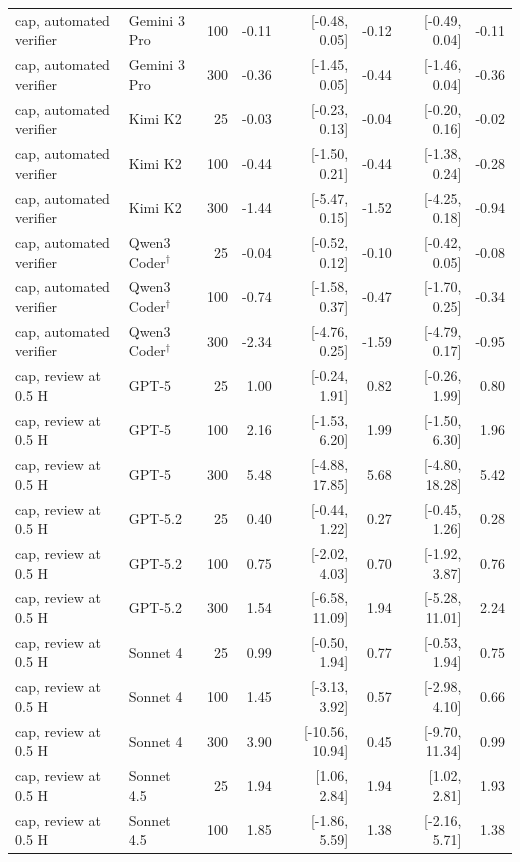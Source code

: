 \begin{table}[t]
\begin{tabular}{llrrrrrr}
cap, automated verifier & Gemini 3 Pro & 100 & -0.11 & [-0.48, 0.05] & -0.12 & [-0.49, 0.04] & -0.11 \\
cap, automated verifier & Gemini 3 Pro & 300 & -0.36 & [-1.45, 0.05] & -0.44 & [-1.46, 0.04] & -0.36 \\
cap, automated verifier & Kimi K2 & 25 & -0.03 & [-0.23, 0.13] & -0.04 & [-0.20, 0.16] & -0.02 \\
cap, automated verifier & Kimi K2 & 100 & -0.44 & [-1.50, 0.21] & -0.44 & [-1.38, 0.24] & -0.28 \\
cap, automated verifier & Kimi K2 & 300 & -1.44 & [-5.47, 0.15] & -1.52 & [-4.25, 0.18] & -0.94 \\
cap, automated verifier & Qwen3 Coder$^\dagger$ & 25 & -0.04 & [-0.52, 0.12] & -0.10 & [-0.42, 0.05] & -0.08 \\
cap, automated verifier & Qwen3 Coder$^\dagger$ & 100 & -0.74 & [-1.58, 0.37] & -0.47 & [-1.70, 0.25] & -0.34 \\
cap, automated verifier & Qwen3 Coder$^\dagger$ & 300 & -2.34 & [-4.76, 0.25] & -1.59 & [-4.79, 0.17] & -0.95 \\
\midrule
cap, review at 0.5 H & GPT-5 & 25 & 1.00 & [-0.24, 1.91] & 0.82 & [-0.26, 1.99] & 0.80 \\
cap, review at 0.5 H & GPT-5 & 100 & 2.16 & [-1.53, 6.20] & 1.99 & [-1.50, 6.30] & 1.96 \\
cap, review at 0.5 H & GPT-5 & 300 & 5.48 & [-4.88, 17.85] & 5.68 & [-4.80, 18.28] & 5.42 \\
cap, review at 0.5 H & GPT-5.2 & 25 & 0.40 & [-0.44, 1.22] & 0.27 & [-0.45, 1.26] & 0.28 \\
cap, review at 0.5 H & GPT-5.2 & 100 & 0.75 & [-2.02, 4.03] & 0.70 & [-1.92, 3.87] & 0.76 \\
cap, review at 0.5 H & GPT-5.2 & 300 & 1.54 & [-6.58, 11.09] & 1.94 & [-5.28, 11.01] & 2.24 \\
cap, review at 0.5 H & Sonnet 4 & 25 & 0.99 & [-0.50, 1.94] & 0.77 & [-0.53, 1.94] & 0.75 \\
cap, review at 0.5 H & Sonnet 4 & 100 & 1.45 & [-3.13, 3.92] & 0.57 & [-2.98, 4.10] & 0.66 \\
cap, review at 0.5 H & Sonnet 4 & 300 & 3.90 & [-10.56, 10.94] & 0.45 & [-9.70, 11.34] & 0.99 \\
cap, review at 0.5 H & Sonnet 4.5 & 25 & 1.94 & [1.06, 2.84] & 1.94 & [1.02, 2.81] & 1.93 \\
cap, review at 0.5 H & Sonnet 4.5 & 100 & 1.85 & [-1.86, 5.59] & 1.38 & [-2.16, 5.71] & 1.38 \\

\end{tabular}
\end{table}
